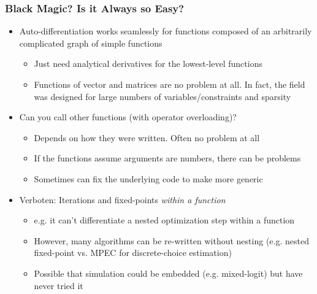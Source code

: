 \documentclass[nofootline]{etk-presentation}
\begin{document}
\begin{frame}[fragile]	\frametitle{Black Magic? Is it Always so Easy?}
	\begin{itemize}
		\item Auto-differentiation works seamlessly for functions composed of an arbitrarily complicated graph of simple functions
		\begin{itemize}
			\item Just need analytical derivatives for the lowest-level functions
			\item Functions of vector and matrices are no problem at all.  In fact, the field was designed for large numbers of variables/constraints and sparsity
		\end{itemize}
	\bigskip
		\item Can you call other functions (with operator overloading)?
		\begin{itemize}
			\item Depends on how they were written.  Often no problem at all
			\item If the functions assume arguments are numbers, there can be problems
			\item Sometimes can fix the underlying code to make more generic
		\end{itemize}
	\bigskip
		\item Verboten: Iterations and fixed-points \textit{within a function}
		\begin{itemize}
			\item e.g. it can't differentiate a nested optimization step within a function
			\item However, many algorithms can be re-written without nesting (e.g. nested fixed-point vs. MPEC for discrete-choice estimation)
			\item Possible that simulation could be embedded (e.g. mixed-logit) but have never tried it
		\end{itemize}
	\end{itemize}
\end{frame}	
\end{document}
